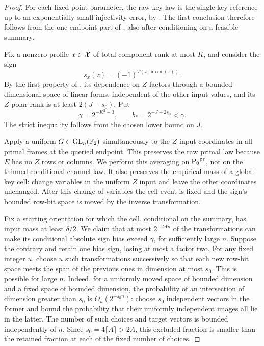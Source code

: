 \begin{proof}
For each fixed point parameter, the raw key law is the single-key
reference up to an exponentially small injectivity error, by
. The first conclusion therefore follows from
the one-endpoint part of , also after conditioning
on a feasible summary.

Fix a nonzero profile $x\in\mathcal X$ of total component rank at most $K$,
and consider the sign
\[
 s_x(z)=(-1)^{T(x,\operatorname{atom}(z))}.
\]
By the first property of , its dependence on
$Z$ factors through a bounded-dimensional space of linear forms,
independent of the other input values, and its $Z$-polar rank is at
least $2(J-s_0)$. Put
\[
 \gamma=2^{-K^2-3},\qquad b_*=2^{-J+2s_0}<\gamma.
\]
The strict inequality follows from the chosen lower bound on $J$.

Apply a uniform $G\in\operatorname{GL}_n(\mathbb F_2)$ simultaneously to the $Z$ input
coordinates in all primal frames at the queried endpoint. This
preserves the raw primal law because $E$ has no $Z$ rows or columns.
We perform this averaging on ${\mathsf P_0}^{\mathrm{pr}}$, not on the
thinned conditional channel law. It also
preserves the empirical mass of a global key cell: change variables
in the uniform $Z$ input and leave the other coordinates unchanged.
After this change of variables the cell event is fixed and the sign's
bounded row-bit space is moved by the inverse transformation.

Fix a starting orientation for which the cell, conditional on the
summary, has input mass at least $\delta/2$. We claim that at most
$2^{-2An}$ of the transformations can make its conditional absolute
sign bias exceed $\gamma$, for sufficiently large $n$. Suppose the
contrary and retain one bias sign, losing at most a factor two. For
any fixed integer $u$, choose $u$ such transformations successively so
that each new row-bit space meets the span of the previous ones in
dimension at most $s_0$. This is possible for large $n$. Indeed, for
a uniformly moved space of bounded dimension and a fixed space of
bounded dimension, the probability of an intersection of dimension
greater than $s_0$ is $O_u(2^{-s_0n})$: choose $s_0$ independent
vectors in the former and bound the probability that their uniformly
independent images all lie in the latter. The number of such choices
and target vectors is bounded independently of $n$. Since
$s_0=4\lceil A\rceil>2A$, this excluded fraction is smaller than the
retained fraction at each of the fixed number of choices.


\end{proof}
